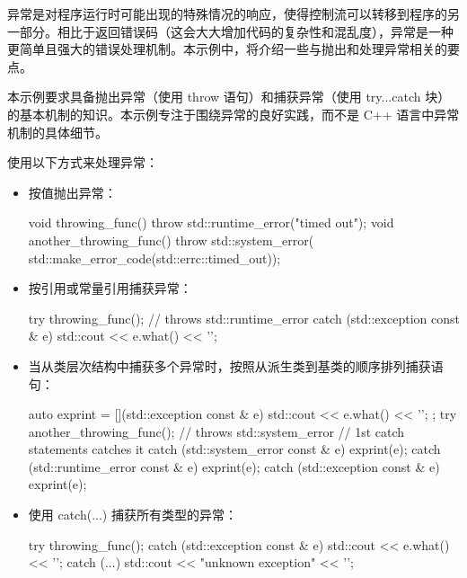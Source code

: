 
异常是对程序运行时可能出现的特殊情况的响应，使得控制流可以转移到程序的另一部分。相比于返回错误码（这会大大增加代码的复杂性和混乱度），异常是一种更简单且强大的错误处理机制。本示例中，将介绍一些与抛出和处理异常相关的要点。


本示例要求具备抛出异常（使用 throw 语句）和捕获异常（使用 try...catch 块）的基本机制的知识。本示例专注于围绕异常的良好实践，而不是 C++ 语言中异常机制的具体细节。


使用以下方式来处理异常：

\begin{itemize}
\item
按值抛出异常：

\begin{cpp}
void throwing_func()
{
    throw std::runtime_error("timed out");
}
void another_throwing_func()
{
    throw std::system_error(
    std::make_error_code(std::errc::timed_out));
}
\end{cpp}

\item
按引用或常量引用捕获异常：

\begin{cpp}
try
{
    throwing_func(); // throws std::runtime_error
}
catch (std::exception const & e)
{
    std::cout << e.what() << '\n';
}
\end{cpp}

\item
当从类层次结构中捕获多个异常时，按照从派生类到基类的顺序排列捕获语句：

\begin{cpp}
auto exprint = [](std::exception const & e)
{
    std::cout << e.what() << '\n';
};
try
{
    another_throwing_func(); // throws std::system_error
    // 1st catch statements catches it
}
catch (std::system_error const & e)
{
    exprint(e);
}
catch (std::runtime_error const & e)
{
    exprint(e);
}
catch (std::exception const & e)
{
    exprint(e);
}
\end{cpp}

\item
使用 catch(...) 捕获所有类型的异常：

\begin{cpp}
try
{
    throwing_func();
}
catch (std::exception const & e)
{
    std::cout << e.what() << '\n';
}
catch (...)
{
    std::cout << "unknown exception" << '\n';
}
\end{cpp}


\end{itemize}
